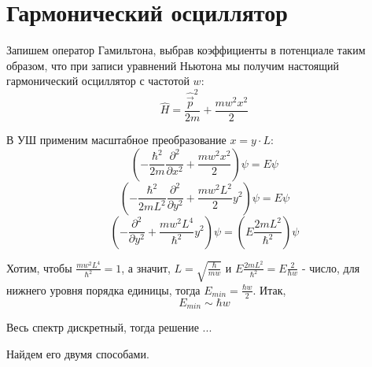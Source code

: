 \newpage
\chapter{Гармонический осциллятор}
\par Запишем оператор Гамильтона, выбрав коэффициенты в потенциале таким образом, что при записи уравнений Ньютона мы получим настоящий гармонический осциллятор с частотой $w$:
$$\hat{H}=\frac{\hat{\vec{p}}^2}{2m} +\frac{m w^2x^2}{2}$$
\par В УШ применим масштабное преобразование $x=y\cdot L$:
$$\left(-\frac{\hbar^2}{2m} \frac{\partial^2}{\partial x^2} + \frac{m w^2x^2}{2} \right) \psi = E \psi$$
$$\left(-\frac{\hbar^2}{2mL^2} \frac{\partial^2}{\partial y^2} + \frac{m w^2L^2}{2} y^2 \right) \psi = E \psi$$
$$\left(- \frac{\partial^2}{\partial y^2} + \frac{m w^2L^4}{\hbar^2} y^2 \right) \psi = \left( E \frac{2mL^2}{\hbar^2} \right)\psi$$
\par Хотим, чтобы $ \frac{m w^2L^4}{\hbar^2} =1$, а значит, $L = \sqrt{\frac{\hbar}{mw}}$ и $ E \frac{2mL^2}{\hbar^2} = E \frac{2}{\hbar w}$ - число, для нижнего уровня порядка единицы, тогда $E_{min}=\frac{\hbar w }{2}$. Итак,
$$E_{min} \sim \hbar w$$
\par Весь спектр дискретный, тогда решение ...
\par Найдем его двумя способами. 
